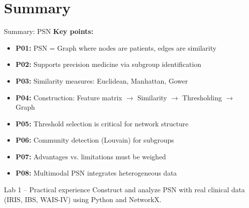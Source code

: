\documentclass[aspectratio=169, 10pt]{beamer}
\begin{document}
\section*{Summary}

\begin{frame}{Summary: PSN}
    \textbf{Key points:}
    \begin{itemize}
        \item \textbf{P01:} PSN = Graph where nodes are patients, edges are similarity
        \item \textbf{P02:} Supports precision medicine via subgroup identification
        \item \textbf{P03:} Similarity measures: Euclidean, Manhattan, Gower
        \item \textbf{P04:} Construction: Feature matrix $\rightarrow$ Similarity $\rightarrow$ Thresholding $\rightarrow$ Graph
        \item \textbf{P05:} Threshold selection is critical for network structure
        \item \textbf{P06:} Community detection (Louvain) for subgroups
        \item \textbf{P07:} Advantages vs. limitations must be weighed
        \item \textbf{P08:} Multimodal PSN integrates heterogeneous data
    \end{itemize}
    
    \vspace{0.3cm}
    \begin{block}{\footnotesize Lab 1 -- Practical experience}
        \footnotesize Construct and analyze PSN with real clinical data (IRIS, IBS, WAIS-IV) using Python and NetworkX.
    \end{block}
\end{frame}
\end{document}
